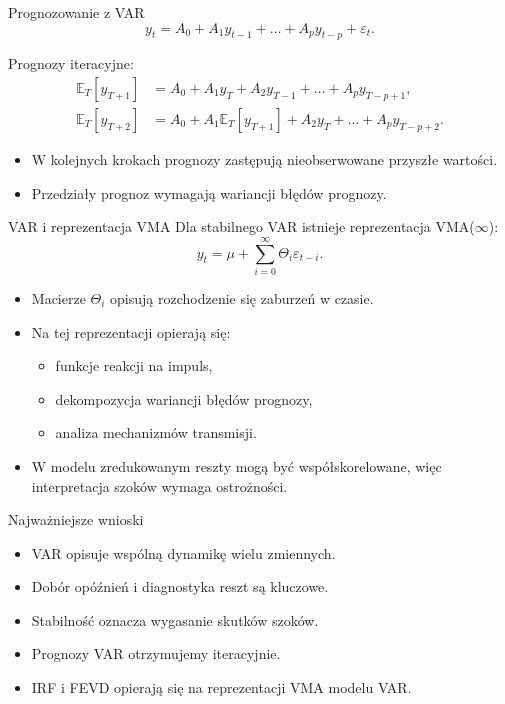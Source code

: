 \documentclass[11pt,aspectratio=169,xcolor=dvipsnames]{beamer}
\newcommand{\E}{\mathbb{E}}
\begin{document}
\begin{frame}{Prognozowanie z VAR}
  \[
    y_t = A_0 + A_1y_{t-1} + \ldots + A_py_{t-p} + \varepsilon_t.
  \]

  Prognozy iteracyjne:
  \begin{align*}
    \E_T[y_{T+1}] &=
      A_0 + A_1y_T + A_2y_{T-1} + \ldots + A_py_{T-p+1},\\
    \E_T[y_{T+2}] &=
      A_0 + A_1\E_T[y_{T+1}] + A_2y_T + \ldots + A_py_{T-p+2}.
  \end{align*}

  \begin{itemize}
    \item W kolejnych krokach prognozy zastępują nieobserwowane przyszłe wartości.
    \item Przedziały prognoz wymagają wariancji błędów prognozy.
  \end{itemize}
\end{frame}

\begin{frame}{VAR i reprezentacja VMA}
  Dla stabilnego VAR istnieje reprezentacja VMA($\infty$):
  \[
    y_t = \mu + \sum_{i=0}^{\infty}\Theta_i\varepsilon_{t-i}.
  \]

  \begin{itemize}
    \item Macierze $\Theta_i$ opisują rozchodzenie się zaburzeń w czasie.
    \item Na tej reprezentacji opierają się:
      \begin{itemize}
        \item funkcje reakcji na impuls,
        \item dekompozycja wariancji błędów prognozy,
        \item analiza mechanizmów transmisji.
      \end{itemize}
    \item W modelu zredukowanym reszty mogą być współskorelowane, więc interpretacja szoków wymaga ostrożności.
  \end{itemize}
\end{frame}

\begin{frame}{Najważniejsze wnioski}
  \begin{itemize}
    \item VAR opisuje wspólną dynamikę wielu zmiennych.
    \item Dobór opóźnień i diagnostyka reszt są kluczowe.
    \item Stabilność oznacza wygasanie skutków szoków.
    \item Prognozy VAR otrzymujemy iteracyjnie.
    \item IRF i FEVD opierają się na reprezentacji VMA modelu VAR.
  \end{itemize}
\end{frame}
\end{document}

